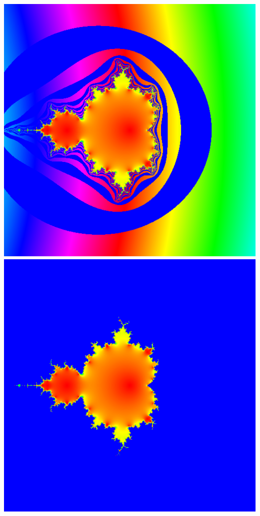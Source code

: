 \documentclass[../r.tex]{subfiles}
\begin{document}
\noindent
\includegraphics[scale=0.15]{../TAing/mandel/5.png}
\includegraphics[scale=0.15]{../TAing/mandel/6.png}
\end{document}
